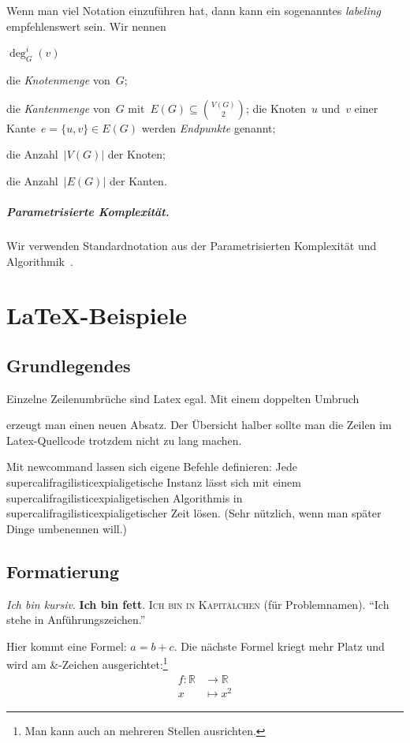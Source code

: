 \documentclass[a4paper,titlepage,onecolumn,twoside,12pt,ngerman,titlepage=firstiscover]{scrbook}
\theoremstyle{plain} %
\theoremstyle{definition} %
\theoremstyle{remark} %
\theoremstyle{plain}
\newcommand{\RR}{\mathbb{R}} %
\begin{document}
Wenn man viel Notation einzuführen hat, dann kann ein sogenanntes \emph{labeling} empfehlenswert sein.
Wir nennen
\begin{labeling}{$\deg^i_G(v)$}
	\item[$V(G)$] die \emph{Knotenmenge} von~$G$;
	\item[$E(G)$] die \emph{Kantenmenge} von~$G$ mit~$E(G) \subseteq \binom{V(G)}{2}$; die Knoten~$u$ und~$v$ einer Kante~$e = \{u, v\} \in E(G)$ werden \emph{Endpunkte} genannt;
	\item[$n_G$] die Anzahl~$|V(G)|$ der Knoten;
	\item[$m_G$] die Anzahl~$|E(G)|$ der Kanten.
\end{labeling}

\paragraph*{Parametrisierte Komplexität.} 
Wir verwenden Standardnotation aus der Parametrisierten Komplexität und Algorithmik~\cite{Nie06}.

\chapter{\LaTeX{}-Beispiele}

\section{Grundlegendes}
Einzelne Zeilenumbrüche
sind 
Latex egal.
Mit einem doppelten Umbruch

erzeugt man einen neuen Absatz.
Der Übersicht halber sollte man die Zeilen im Latex-Quellcode trotzdem nicht zu lang machen.

Mit newcommand lassen sich eigene Befehle definieren:
\newcommand{\sfe}{supercalifragilisticexpialigetisch}
Jede \sfe{}e Instanz lässt sich mit einem \sfe{}en Algorithmis in \sfe{}er Zeit lösen.
(Sehr nützlich, wenn man später Dinge umbenennen will.)

\section{Formatierung}
\textit{Ich bin kursiv}.
\textbf{Ich bin fett}.
\textsc{Ich bin in Kapitälchen} (für Problemnamen).
\enquote{Ich stehe in Anführungszeichen.}

Hier kommt eine Formel: $a = b + c$.
Die nächste Formel kriegt mehr Platz und wird am \&-Zeichen ausgerichtet:\footnote{Man kann auch an mehreren Stellen ausrichten.}
\begin{align*}
f : \RR &\to \RR \\
x &\mapsto x^2
\end{align*}
\end{document}
